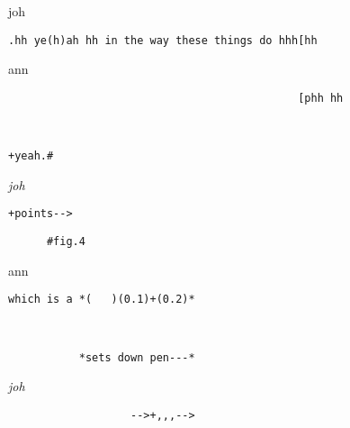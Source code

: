 \documentclass[output=paper,nonflat,modfont,draft]{langsci/langscibook}
\begin{document}
\begin{transbox}{3}{joh}
\begin{verbatim}
.hh ye(h)ah hh in the way these things do hhh[hh
\end{verbatim}
\end{transbox}

\begin{transbox}{4}{ann}
\begin{verbatim}
                                             [phh hh
\end{verbatim}
\end{transbox}

\begin{transbox}{5}{~}
\begin{verbatim}
+yeah.#
\end{verbatim}
\end{transbox}

\begin{mdframedkendrick}[style=firstfoc]
\begin{transbox}{6}{\textit{joh}}
\begin{verbatim}
+points-->
\end{verbatim}
\end{transbox}
\end{mdframedkendrick}\vspace{-5mm}

\begin{transbox}{7}{\fig}
\begin{verbatim}
      #fig.4
\end{verbatim}
\end{transbox}


\begin{transbox}{9}{ann}
\begin{verbatim}
which is a *(   )(0.1)+(0.2)*
\end{verbatim}
\end{transbox}

\begin{transbox}{10}{~}
\begin{verbatim}
           *sets down pen---*
\end{verbatim}
\end{transbox}

\begin{transbox}{11}{\textit{joh}}
\begin{verbatim}
                   -->+,,,-->
\end{verbatim}
\end{transbox}
\end{document}
